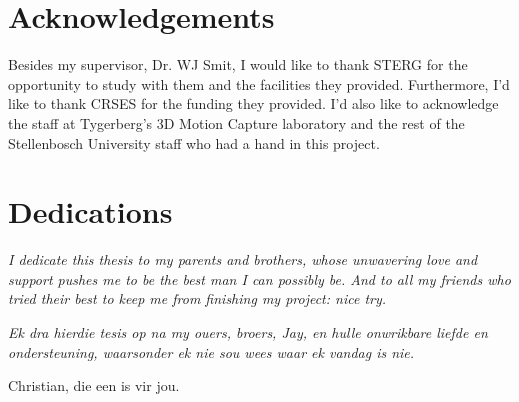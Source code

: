 \chapter{Acknowledgements}%

Besides my supervisor, Dr. WJ Smit, I would like to thank STERG for the opportunity to study with them and the facilities they provided. Furthermore, I'd like to thank CRSES for the funding they provided. I'd also like to acknowledge the staff at Tygerberg's 3D Motion Capture laboratory and the rest of the Stellenbosch University staff who had a hand in this project.

\chapter{Dedications}%

\vfill
\begin{center}\itshape%
  I dedicate this thesis to my parents and brothers, whose unwavering love and support pushes me to be the best man I can possibly be. And to all my friends who tried their best to keep me from finishing my project: nice try.
\end{center}
\vfill

\vfill
\begin{Afr}
  \begin{center}\itshape%
    Ek dra hierdie tesis op na my ouers, broers, Jay, en hulle onwrikbare liefde en ondersteuning, waarsonder ek nie sou wees waar ek vandag is nie. 

    Christian, die een is vir jou.
  \end{center}
\end{Afr}
\vfill
\clearpage
	   
\endinput
